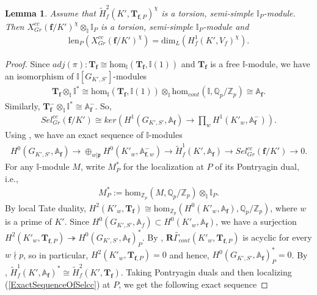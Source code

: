 \documentclass[reqno,10pt]{amsart}
\newcommand{\zp}{\mathbb{Z}_{p}}
\newcommand{\qp}{\mathbb{Q}_{p}}
\newcommand{\I}{\mathbb{I}}
\newcommand{\f}{\mathbf{f}}
\newcommand{\T}{\mathbf{T}}
\newcommand{\p}{\mathfrak{p}}
\theoremstyle{plain}
\newtheorem{lem}[thm]{Lemma}
\theoremstyle{definition}
\begin{document}
\begin{lem}
    Assume that $\widetilde{H}^2_f(K',\T_{\f,P})^\chi$ is a torsion, semi-simple $\I_P$-module. Then $X^{cc}_{Gr}(\f/K')^\chi \otimes_\I \I_P$ is a torsion, semi-simple $\I_P$-module and 
    \begin{align*}
        \mathrm{len}_P(X^{cc}_{Gr}(\f/K')^\chi) = \mathrm{dim}_L(H^1_f(K',V_f)^\chi).
    \end{align*}
\end{lem}

\begin{proof}
     Since $adj(\pi) : \T_\f \cong \mathrm{hom}_\I(\T_\f,\I(1))$ and $\T_\f$ is a free $\I$-module, we have an isomorphism of $\I[G_{K',S'}]$-modules
    \begin{align*}
        \T_\f \otimes_\I \I^* \cong \mathrm{hom}_\I(\T_\f,\I(1)) \otimes_\I \mathrm{hom}_{cont}(\I,\qp/\zp) \cong \mathds{A}_\f. 
    \end{align*}
    Similarly, $\T_\f^- \otimes_\I \I^* \cong \mathds{A}_\f^-$. So,
    \begin{align*}
        Sel^{cc}_{Gr}(\f/K') \cong ker \left(H^1(G_{K',S'},\mathds{A}_\f) \rightarrow \prod_w H^1(K'_w,\mathds{A}_\f^-) \right).
    \end{align*}
    Using \cite[6.1.3.2]{Nekovar}, we have an exact sequence of $\I$-modules
    \begin{align}\label{ExactSequenceOfSelcc}
        H^0(G_{K',S'},\mathds{A}_\f) \rightarrow \oplus_{w|\p} H^0(K'_w,\mathds{A}_{\f,w}^-) \rightarrow \widetilde{H}^1_f(K',\mathds{A}_\f) \rightarrow Sel^{cc}_{Gr}(\f/K') \rightarrow 0.
    \end{align}
    For any $\I$-module $M$, write $M_P^*$ for the localization at $P$ of its Pontryagin dual, i.e., 
    \begin{align*}
        M_P^* := \mathrm{hom}_{\zp}(M,\qp/\zp) \otimes_\I \I_P.
    \end{align*}
    By local Tate duality, $H^2(K'_w,\T_\f) \cong \mathrm{hom}_{\zp}(H^0(K'_w,\mathds{A}_\f),\qp/\zp)$, where $w$ is a prime of $K'$. Since $H^0(G_{K',S'},\mathds{A}_f) \subset H^0(K'_w,\mathds{A}_\f)$, we have a surjection $H^2(K'_w,\T_{\f,P}) \twoheadrightarrow H^0(G_{K',S'},\mathds{A}_\f)^*_P$. By \cite[Proposition 12.7.13.3]{Nekovar}, $\widetilde{\textbf{R}\Gamma_{cont}}(K'_w,\T_{\f,P})$ is acyclic for every $w \nmid p$, so in particular, $H^2(K'_w,\T_{\f,P}) = 0$ and hence, $H^0(G_{K',S'},\mathds{A}_\f)^*_P = 0$. By \cite[Section 6.3]{Nekovar}, $\widetilde{H}^1_f(K',\mathds{A}_\f)^* \cong \widetilde{H}^2_f(K',\T_\f)$. Taking Pontryagin duals and then localizing (\ref{ExactSequenceOfSelcc}) at $P$, we get the following exact sequence

\end{proof}
\end{document}
